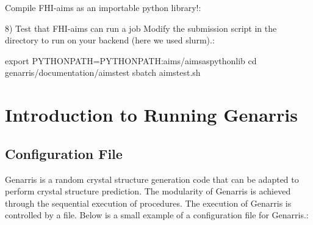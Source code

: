 \documentclass[letterpaper,10pt,english]{sphinxmanual}
\begin{document}
Compile FHI-aims as an importable python library!:

\begin{sphinxVerbatim}[commandchars=\\\{\}]
\end{sphinxVerbatim}

8) Test that FHI-aims can run a job
Modify the submission script in the 
directory to run on your backend (here we used slurm).:

\begin{sphinxVerbatim}[commandchars=\\\{\}]
export PYTHONPATH=\PYGZdl{}PYTHONPATH:\PYGZdl{}aims/aims\PYGZus{}as\PYGZus{}python\PYGZus{}lib
cd \PYGZdl{}genarris/documentation/aims\PYGZus{}test
sbatch aims\PYGZus{}test.sh
\end{sphinxVerbatim}


\chapter{Introduction to Running Genarris}
\label{\detokenize{index:introduction-to-running-genarris}}

\section{Configuration File}
\label{\detokenize{index:configuration-file}}
Genarris is a random crystal structure generation code that can be adapted to
perform  crystal structure prediction. The modularity of Genarris
is achieved through the sequential execution of procedures. The execution of
Genarris is controlled by a  file. Below is a small example
of a configuration file for Genarris.:
\end{document}
